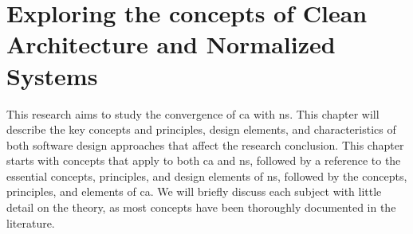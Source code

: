 \chapter{Exploring the concepts of Clean Architecture and Normalized Systems} \label{chap_theoreticalbackground} 

This research aims to study the convergence of \gls{ca} with \gls{ns}. This chapter will
describe the key concepts and principles, design elements, and characteristics of both
software design approaches that affect the research conclusion. This chapter starts with
concepts that apply to both \gls{ca} and \gls{ns}, followed by a reference to the
essential concepts, principles, and design elements of \gls{ns}, followed by the concepts,
principles, and elements of \gls{ca}. We will briefly discuss each subject with little
detail on the theory, as most concepts have been thoroughly documented in the literature.




